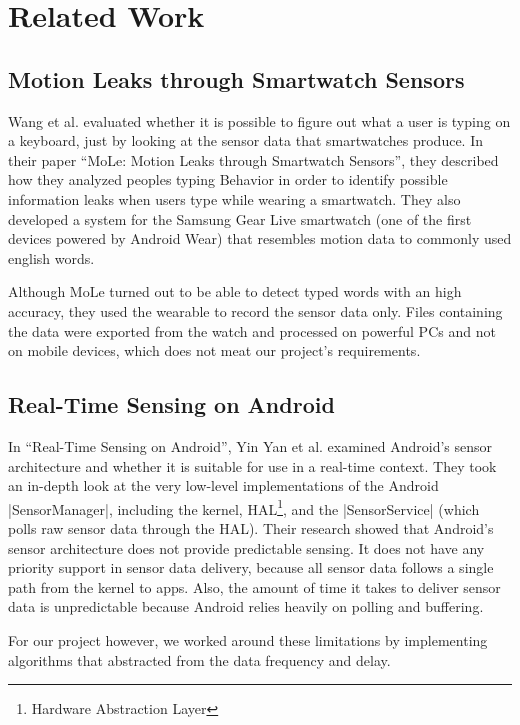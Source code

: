 \section{Related Work}
\label{sec:relatedwork}

\subsection{Motion Leaks through Smartwatch Sensors}
Wang et al. evaluated whether it is possible to figure out what a user is typing on a keyboard, just by looking at the sensor data that smartwatches produce.
In their paper ``MoLe: Motion Leaks through Smartwatch Sensors''\cite{paper:motionleaks}, they described how they analyzed peoples typing Behavior in order to identify possible information leaks when users type while wearing a smartwatch.
They also developed a system for the Samsung Gear Live smartwatch (one of the first devices powered by Android Wear) that resembles motion data to commonly used english words.

Although MoLe turned out to be able to detect typed words with an high accuracy, they used the wearable to record the sensor data only.
Files containing the data were exported from the watch and processed on powerful PCs and not on mobile devices, which does not meat our project's requirements.

\subsection{Real-Time Sensing on Android}
In ``Real-Time Sensing on Android''\cite{paper:realtimesensing}, Yin Yan et al. examined Android’s sensor architecture and whether it is suitable for use in a real-time context.
They took an in-depth look at the very low-level implementations of the Android |SensorManager|\cite{androiddocs:sensormanager}, including the kernel, HAL\footnote{Hardware Abstraction Layer}, and the |SensorService| (which polls raw sensor data through the HAL).
Their research showed that Android's sensor architecture does not provide predictable sensing.
It does not have any priority support in sensor data delivery, because all sensor data follows a single path from the kernel to apps.
Also, the amount of time it takes to deliver sensor data is unpredictable because Android relies heavily on polling and buffering.

For our project however, we worked around these limitations by implementing algorithms that abstracted from the data frequency and delay.

